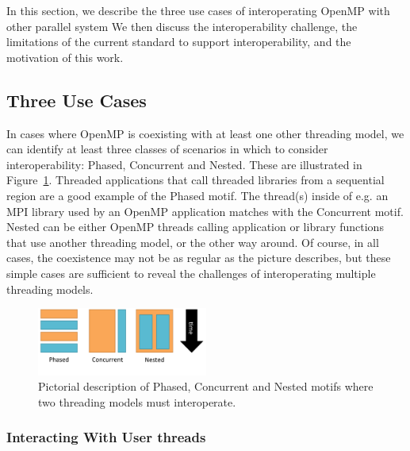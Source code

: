 In this section, we describe the three use cases of interoperating OpenMP with other parallel system
We then discuss the interoperability challenge, the limitations of the current standard to support 
interoperability, and the motivation of this work. 
\subsection{Three Use Cases} %

In cases where OpenMP is coexisting with at least one other threading model,
we can identify at least three classes of scenarios in which to consider
interoperability: Phased, Concurrent and Nested.
These are illustrated in Figure~\ref{fig:interop-motif}.
Threaded applications that call threaded libraries from a sequential region
are a good example of the Phased motif.
The thread(s) inside of e.g. an MPI library used by an OpenMP application
matches with the Concurrent motif.
Nested can be either OpenMP threads calling application or library
functions that use another threading model, or the other way around.
Of course, in all cases, the coexistence may not be as regular as
the picture describes, but these simple cases are sufficient to reveal
the challenges of interoperating multiple threading models.
\begin{figure}[htb]
\centering
\includegraphics[width=0.5\textwidth]{images/interop-motifs}
\caption{Pictorial description of Phased, Concurrent and Nested
motifs where two threading models must interoperate.
\label{fig:interop-motif}
}
\end{figure}


\subsubsection{Interacting With User threads}


